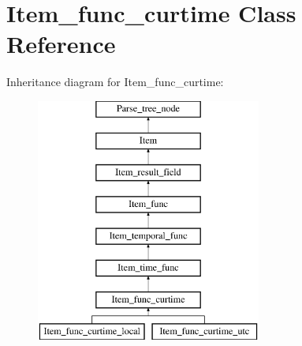 \hypertarget{classItem__func__curtime}{}\section{Item\+\_\+func\+\_\+curtime Class Reference}
\label{classItem__func__curtime}
Inheritance diagram for Item\+\_\+func\+\_\+curtime\+:\begin{figure}[H]
\begin{center}
\leavevmode
\includegraphics[height=8.000000cm]{classItem__func__curtime}
\end{center}
\end{figure}

